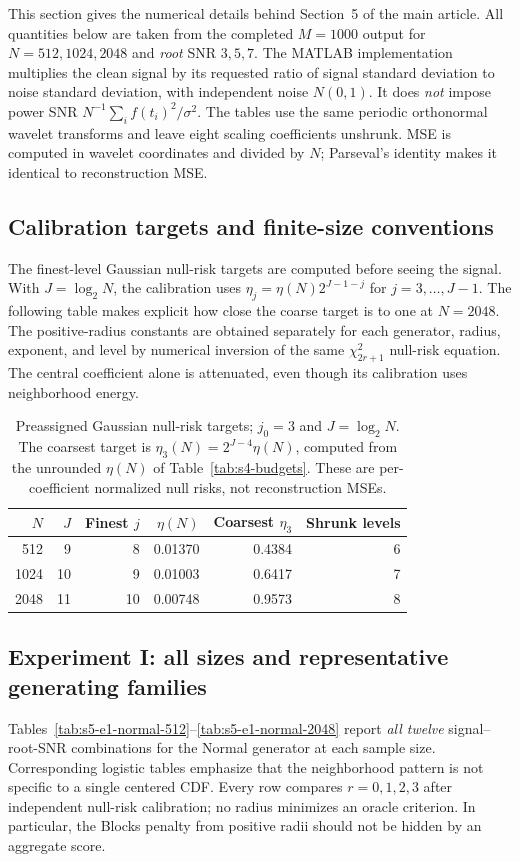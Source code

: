 \documentclass[11pt]{article}
\numberwithin{equation}{section}
\begin{document}
This section gives the numerical details behind Section~5 of the main article.
All quantities below are taken from the completed $M=1000$ output for
$N=512,1024,2048$ and \emph{root} SNR $3,5,7$.
The MATLAB implementation multiplies the clean signal by its
requested ratio of signal standard deviation to noise standard deviation,
with independent noise $N(0,1)$. It does \emph{not} impose power SNR
$N^{-1}\sum_i f(t_i)^2/\sigma^2$. The tables use the same periodic
orthonormal wavelet transforms and leave eight scaling coefficients
unshrunk. MSE is computed in wavelet coordinates and divided by $N$;
Parseval's identity makes it identical to reconstruction MSE.

\subsection{Calibration targets and finite-size conventions}
\label{sec:supp-calib}
The finest-level Gaussian null-risk targets are computed before seeing
the signal. With $J=\log_2N$, the calibration uses
$\eta_j=\eta(N)2^{J-1-j}$ for $j=3,\ldots,J-1$.
The following table makes explicit how close the coarse target is to
one at $N=2048$. The positive-radius constants are obtained separately
for each generator, radius, exponent, and level by numerical inversion
of the same $\chi^2_{2r+1}$ null-risk equation. The central coefficient
alone is attenuated, even though its calibration uses neighborhood energy.

\begin{table}[H]
\centering\small
\caption{Preassigned Gaussian null-risk targets; $j_0=3$ and $J=\log_2 N$. The coarsest target is $\eta_3(N)=2^{J-4}\eta(N)$, computed from the unrounded $\eta(N)$ of Table~\ref{tab:s4-budgets}. These are per-coefficient normalized null risks, not reconstruction MSEs.}
\label{tab:s5-eta}
\setlength{\tabcolsep}{5pt}
\begin{tabular}{rrrrrr}
\toprule
$N$ & $J$ & Finest $j$ & $\eta(N)$ & Coarsest $\eta_3$ & Shrunk levels \\
\midrule
512 & 9 & 8 & 0.01370 & 0.4384 & 6 \\
1024 & 10 & 9 & 0.01003 & 0.6417 & 7 \\
2048 & 11 & 10 & 0.00748 & 0.9573 & 8 \\
\bottomrule
\end{tabular}
\end{table}

\subsection{Experiment I: all sizes and representative generating families}
\label{sec:supp-e1}
Tables~\ref{tab:s5-e1-normal-512}--\ref{tab:s5-e1-normal-2048}
report \emph{all twelve} signal--root-SNR combinations for the Normal
generator at each sample size. Corresponding logistic tables emphasize
that the neighborhood pattern is not specific to a single centered
CDF. Every row compares $r=0,1,2,3$ after independent null-risk
calibration; no radius minimizes an oracle criterion. In particular,
the Blocks penalty from positive radii should not be hidden by an
aggregate score.
\end{document}
